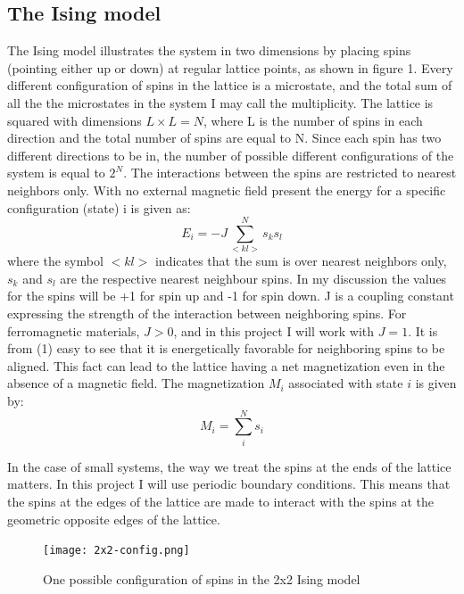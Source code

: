 \documentclass[twocolumn]{article}
\begin{document}
\subsection{The Ising model}
The Ising model illustrates the system in two dimensions by placing spins (pointing either up or down) at regular lattice points, as shown in figure 1. Every different configuration of spins in the lattice is a microstate, and  the total sum of all the the microstates in the system I may call the multiplicity. The lattice is squared with dimensions $L \times L = N$, where L is the number of spins in each direction and the total number of spins are equal to N. Since each spin has two different directions to be in, the number of possible different configurations of the system is equal to $2^N$. The interactions between the spins are restricted to nearest neighbors only.\newline
With no external magnetic field present the energy for a specific configuration (state) i is given as:
\begin{equation}
    E_i = -J \sum_{<kl>}^{N} s_k s_l
\end{equation}
where the symbol $<kl>$ indicates that the sum is over nearest neighbors only, $s_k$ and $s_l$ are the respective nearest neighbour spins. In my discussion the values for the spins will be +1 for spin up and -1 for spin down. J is a coupling constant expressing the strength of the interaction between neighboring spins. For ferromagnetic materials, $J > 0$, and in this project I will work with $J = 1$. It is from (1) easy to see that it is energetically favorable for neighboring spins to be aligned. This fact can lead to the lattice having a net magnetization even in the absence of a magnetic field.\newline
The magnetization $M_i$ associated with state $i$ is given by:
\begin{equation}
    M_i = \sum_{i}^{N}s_i
\end{equation}

In the case of small systems, the way we treat the spins at the ends of the lattice matters. In this project I will use periodic boundary conditions. This means that the spins at the edges of the lattice are made to interact with the spins at the geometric opposite edges of the lattice.\newline

\begin{figure}[h!]
  \centering
  \caption{One possible configuration of spins in the 2x2 Ising model}
  \texttt{[image: 2x2-config.png]}
\end{figure}
\end{document}

